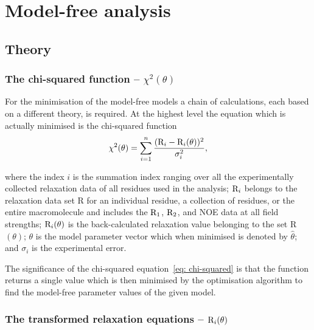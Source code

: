 
\chapter{Model-free analysis}




\section{Theory}



\subsection{The chi-squared function -- $\chi^2(\theta)$}

For the minimisation of the model-free models a chain of calculations, each based on a different theory, is required.  At the highest level the equation which is actually minimised is the chi-squared function
\begin{equation} \label{eq: chi-squared}
 \chi^2(\theta) = \sum_{i=1}^n \frac{(\mathrm{R}_i - \mathrm{R}_i(\theta))^2}{\sigma_i^2},
\end{equation}

\noindent where the index $i$ is the summation index ranging over all the experimentally collected relaxation data of all residues used in the analysis; $\mathrm{R}_i$ belongs to the relaxation data set R for an individual residue, a collection of residues, or the entire macromolecule and includes the $\mathrm{R}_1$, $\mathrm{R}_2$, and NOE data at all field strengths; $\mathrm{R}_i(\theta)$ is the back-calculated relaxation value belonging to the set R$(\theta)$; $\theta$ is the model parameter vector which when minimised is denoted by $\hat\theta$; and $\sigma_i$ is the experimental error.

The significance of the chi-squared equation~\eqref{eq: chi-squared} is that the function returns a single value which is then minimised by the optimisation algorithm to find the model-free parameter values of the given model.



\subsection{The transformed relaxation equations -- $\mathrm{R}_i(\theta)$}

